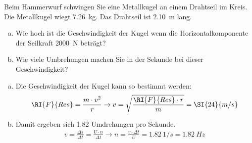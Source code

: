 \begin{aufgabe}
Beim Hammerwurf schwingen Sie eine Metallkugel an einem Drahtseil im Kreis.
Die Metallkugel wiegt \SI{7.26}{kg}.
Das Drahtseil ist \SI{2.10}{m} lang.

\begin{enumerate}[a)]
\item Wie hoch ist die Geschwindigkeit der Kugel wenn die Horizontalkomponente der Seilkraft \SI{2000}{N} beträgt?
\item Wie viele Umbrehungen machen Sie in der Sekunde bei dieser Geschwindigkeit?
\end{enumerate}



\begin{loesung}
	\begin{enumerate} [a)]
		\item Die Geschwindigkeit der Kugel kann so bestimmt werden:
		\begin{eqnarray*}
			\RI{F}{Res}=\frac{m\cdot v^2}{r}\to v=\sqrt{\frac{\RI{F}{Res}\cdot r}{m}}=\SI{24}{m/s}
		\end{eqnarray*}
		\item Damit ergeben sich \num{1.82} Umdrehungen pro Sekunde.
		\begin{eqnarray*}
			v=\frac{\Delta s}{\Delta t}=\frac{U\cdot n}{\Delta t}\to n=\frac{v\cdot \Delta t}{U}=\SI{1.82}{1/s}=\SI{1.82}{Hz}
		\end{eqnarray*}
	\end{enumerate}
%
%
\end{loesung}



\end{aufgabe}
